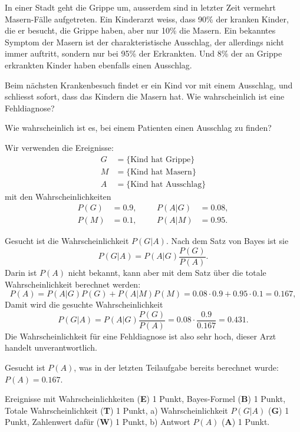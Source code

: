 In einer Stadt geht die Grippe um, ausserdem sind in letzter Zeit
vermehrt Masern-Fälle aufgetreten.
Ein Kinderarzt weiss, dass 90\% der kranken Kinder, die er besucht,
die Grippe haben, aber nur 10\% die Masern.
Ein bekanntes Symptom der Masern ist der charakteristische Ausschlag,
der allerdings nicht immer auftritt, sondern nur bei 95\% der Erkrankten.
Und 8\% der an Grippe erkrankten Kinder haben ebenfalls einen Ausschlag.
\begin{teilaufgaben}
\item
Beim nächsten Krankenbesuch findet er ein Kind vor mit einem Ausschlag,
und schliesst sofort, dass das Kindern die Masern hat.
Wie wahrscheinlich ist eine Fehldiagnose?
\item
Wie wahrscheinlich ist es, bei einem Patienten einen Ausschlag zu finden?
\end{teilaufgaben}

\begin{loesung}
Wir verwenden die Ereignisse:
\begin{align*}
G&=\{\text{Kind hat Grippe}\}\\
M&=\{\text{Kind hat Masern}\}\\
A&=\{\text{Kind hat Ausschlag}\}
\end{align*}
mit den Wahrscheinlichkeiten
\[
\begin{aligned}
P(G)&=0.9,&&&P(A|G)&=0.08,\\
P(M)&=0.1,&&&P(A|M)&=0.95.
\end{aligned}
\]
\begin{teilaufgaben}
\item
Gesucht ist die Wahrscheinlichkeit $P(G|A)$.
Nach dem Satz von Bayes ist sie
\[
P(G|A)=P(A|G)\frac{P(G)}{P(A)}.
\]
Darin ist $P(A)$ nicht bekannt, kann aber mit dem Satz über die totale
Wahrscheinlichkeit berechnet werden:
\[
P(A)=P(A|G)P(G)+P(A|M)P(M)=0.08\cdot 0.9 + 0.95\cdot 0.1=0.167,
\]
Damit wird die gesuchte Wahrscheinlichkeit
\[
P(G|A)=P(A|G)\frac{P(G)}{P(A)}=0.08\cdot\frac{0.9}{0.167}=0.431.
\]
Die Wahrscheinlichkeit für eine Fehldiagnose ist also sehr hoch,
dieser Arzt handelt unverantwortlich.
\item Gesucht ist $P(A)$, was in der letzten Teilaufgabe bereits
berechnet wurde: $P(A)=0.167$.
\qedhere
\end{teilaufgaben}
\end{loesung}

\begin{bewertung}
Ereignisse mit Wahrscheinlichkeiten ({\bf E}) 1 Punkt,
Bayes-Formel ({\bf B}) 1 Punkt,
Totale Wahrscheinlichkeit ({\bf T}) 1 Punkt,
a) Wahrscheinlichkeit $P(G|A)$ ({\bf G}) 1 Punkt, 
Zahlenwert dafür ({\bf W}) 1 Punkt,
b) Antwort $P(A)$ ({\bf A}) 1 Punkt.
\end{bewertung}




